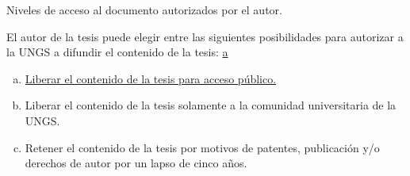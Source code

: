 \noindent Niveles de acceso al documento autorizados por el autor.

El autor de la tesis puede elegir entre las siguientes posibilidades para autorizar  a la UNGS a difundir el contenido de la tesis: \underline{a}
\begin{enumerate}[a)]
	\item \underline{Liberar el contenido de la tesis para acceso público.}
	\item Liberar el contenido de la tesis solamente a la comunidad universitaria de la UNGS.
	\item Retener el contenido de la tesis por motivos de patentes, publicación y/o derechos de autor por un lapso de cinco años. 
\end{enumerate}

